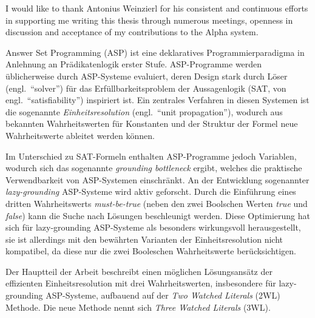 \documentclass{vutinfth} %
\newcommand{\mbt}{must-be-true\xspace}
\begin{document}
\frontmatter %

\addstatementpage


\begin{acknowledgements*}
I would like to thank Antonius Weinzierl for his consistent and continuous efforts in supporting me writing this thesis through numerous meetings, openness in discussion and acceptance of my contributions to the Alpha system.
\end{acknowledgements*}


\begin{kurzfassung*}
Answer Set Programming (ASP) ist eine deklaratives Programmierparadigma in Anlehnung an Prädikatenlogik erster Stufe. ASP-Programme werden üblicherweise durch ASP-Systeme evaluiert, deren Design stark durch Löser (engl.~\enquote{solver}) für das Erfüllbarkeitsproblem der Aussagenlogik (SAT, von engl.~\enquote{satisfiability}) inspiriert ist. Ein zentrales Verfahren in diesen Systemen ist die sogenannte \emph{Einheitsresolution} (engl.~\enquote{unit propagation}), wodurch aus bekannten Wahrheitswerten für Konstanten und der Struktur der Formel neue Wahrheitswerte ableitet werden können.

Im Unterschied zu SAT-Formeln enthalten ASP-Programme jedoch Variablen, wodurch sich das sogenannte \emph{grounding bottleneck} ergibt, welches die praktische Verwendbarkeit von ASP-Systemen einschränkt. An der Entwicklung sogenannter \emph{lazy-grounding} ASP-Systeme wird aktiv geforscht. Durch die Einführung eines dritten Wahrheitswerts \emph{\mbt} (neben den zwei Boolschen Werten \emph{true} und \emph{false}) kann die Suche nach Lösungen beschleunigt werden. Diese Optimierung hat sich für lazy-grounding ASP-Systeme als besonders wirkungsvoll herausgestellt, sie ist allerdings mit den bewährten Varianten der Einheitsresolution nicht kompatibel, da diese nur die zwei Booleschen Wahrheitswerte berücksichtigen.

Der Hauptteil der Arbeit beschreibt einen möglichen Lösungsansätz der effizienten Einheitsresolution mit drei Wahrheitswerten, insbesondere für lazy-grounding ASP-Systeme, aufbauend auf der \emph{Two Watched Literals} (2WL) Methode. Die neue Methode nennt sich \emph{Three Watched Literals} (3WL).


\end{kurzfassung*}
\end{document}

